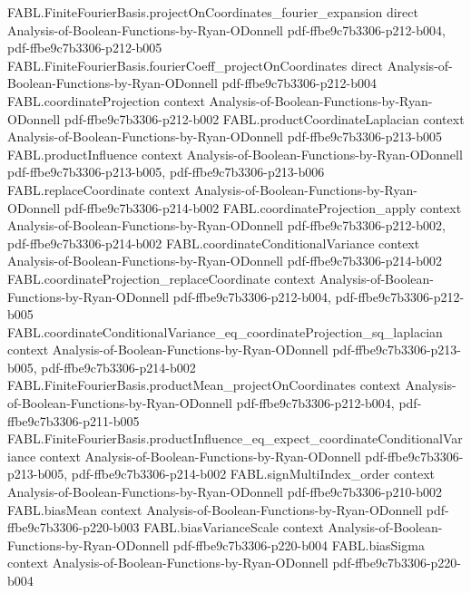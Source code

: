 \begin{theorem}
\proofstep
  {FABL.FiniteFourierBasis.projectOnCoordinates_fourier_expansion}
  {direct}
  {Analysis-of-Boolean-Functions-by-Ryan-ODonnell}
  {pdf-ffbe9c7b3306-p212-b004,
    pdf-ffbe9c7b3306-p212-b005}
\proofstep
  {FABL.FiniteFourierBasis.fourierCoeff_projectOnCoordinates}
  {direct}
  {Analysis-of-Boolean-Functions-by-Ryan-ODonnell}
  {pdf-ffbe9c7b3306-p212-b004}
\proofstep
  {FABL.coordinateProjection}
  {context}
  {Analysis-of-Boolean-Functions-by-Ryan-ODonnell}
  {pdf-ffbe9c7b3306-p212-b002}
\proofstep
  {FABL.productCoordinateLaplacian}
  {context}
  {Analysis-of-Boolean-Functions-by-Ryan-ODonnell}
  {pdf-ffbe9c7b3306-p213-b005}
\proofstep
  {FABL.productInfluence}
  {context}
  {Analysis-of-Boolean-Functions-by-Ryan-ODonnell}
  {pdf-ffbe9c7b3306-p213-b005,
    pdf-ffbe9c7b3306-p213-b006}
\proofstep
  {FABL.replaceCoordinate}
  {context}
  {Analysis-of-Boolean-Functions-by-Ryan-ODonnell}
  {pdf-ffbe9c7b3306-p214-b002}
\proofstep
  {FABL.coordinateProjection_apply}
  {context}
  {Analysis-of-Boolean-Functions-by-Ryan-ODonnell}
  {pdf-ffbe9c7b3306-p212-b002,
    pdf-ffbe9c7b3306-p214-b002}
\proofstep
  {FABL.coordinateConditionalVariance}
  {context}
  {Analysis-of-Boolean-Functions-by-Ryan-ODonnell}
  {pdf-ffbe9c7b3306-p214-b002}
\proofstep
  {FABL.coordinateProjection_replaceCoordinate}
  {context}
  {Analysis-of-Boolean-Functions-by-Ryan-ODonnell}
  {pdf-ffbe9c7b3306-p212-b004,
    pdf-ffbe9c7b3306-p212-b005}
\proofstep
  {FABL.coordinateConditionalVariance_eq_coordinateProjection_sq_laplacian}
  {context}
  {Analysis-of-Boolean-Functions-by-Ryan-ODonnell}
  {pdf-ffbe9c7b3306-p213-b005,
    pdf-ffbe9c7b3306-p214-b002}
\proofstep
  {FABL.FiniteFourierBasis.productMean_projectOnCoordinates}
  {context}
  {Analysis-of-Boolean-Functions-by-Ryan-ODonnell}
  {pdf-ffbe9c7b3306-p212-b004,
    pdf-ffbe9c7b3306-p211-b005}
\proofstep
  {FABL.FiniteFourierBasis.productInfluence_eq_expect_coordinateConditionalVariance}
  {context}
  {Analysis-of-Boolean-Functions-by-Ryan-ODonnell}
  {pdf-ffbe9c7b3306-p213-b005,
    pdf-ffbe9c7b3306-p214-b002}
\proofstep
  {FABL.signMultiIndex_order}
  {context}
  {Analysis-of-Boolean-Functions-by-Ryan-ODonnell}
  {pdf-ffbe9c7b3306-p210-b002}
\proofstep
  {FABL.biasMean}
  {context}
  {Analysis-of-Boolean-Functions-by-Ryan-ODonnell}
  {pdf-ffbe9c7b3306-p220-b003}
\proofstep
  {FABL.biasVarianceScale}
  {context}
  {Analysis-of-Boolean-Functions-by-Ryan-ODonnell}
  {pdf-ffbe9c7b3306-p220-b004}
\proofstep
  {FABL.biasSigma}
  {context}
  {Analysis-of-Boolean-Functions-by-Ryan-ODonnell}
  {pdf-ffbe9c7b3306-p220-b004}
\proofstep

\end{theorem}
